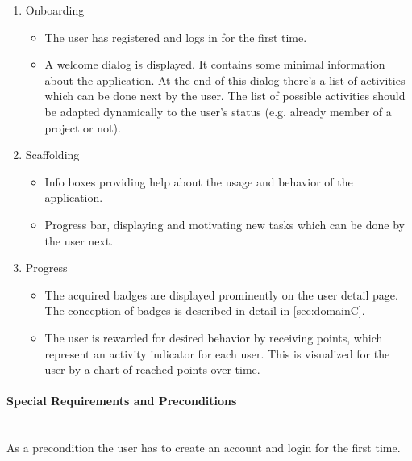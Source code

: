 \begin{enumerate}
	\vspace{-3mm}
	\setlength\itemsep{-1em}
	
	\item Onboarding
	\begin{itemize}
		\vspace{-3mm}
		\setlength\itemsep{-1em}
		
		\item The user has registered and logs in for the first time.
		\item A welcome dialog is displayed. It contains some minimal information about the application. At the end of this dialog there's a list of activities which can be done next by the user. The list of possible activities should be adapted dynamically to the user's status (e.g. already member of a project or not).
	\end{itemize}

	\item Scaffolding
	\begin{itemize}
		\vspace{-3mm}
		\setlength\itemsep{-1em}
		
		\item Info boxes providing help about the usage and behavior of the application.
		\item Progress bar, displaying and motivating new tasks which can be done by the user next.
	\end{itemize}

	\item Progress
	\begin{itemize}
		\vspace{-3mm}
		\setlength\itemsep{-1em}	
		\item The acquired badges are displayed prominently on the user detail page. The conception of badges is described in detail in \ref{sec:domainC}.
		\item The user is rewarded for desired behavior by receiving points, which represent an activity indicator for each user. This is visualized for the user by a chart of reached points over time.
	\end{itemize}
\end{enumerate}

\paragraph*{Special Requirements and Preconditions}\mbox{}\\
As a precondition the user has to create an account and login for the first time. 

